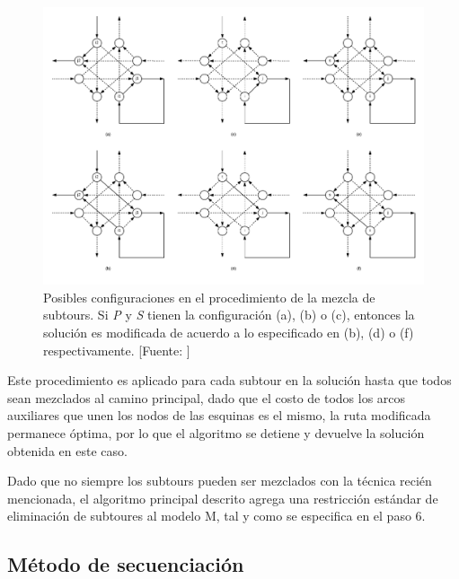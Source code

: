 \begin{figure}[tbp]
\centerline{\includegraphics[width=13cm]{mezcla_subtours.png}}
\caption{Posibles configuraciones en el procedimiento de la mezcla de subtours. Si \textit{P} y \textit{S} tienen la configuración (a), (b) o (c), entonces la solución es modificada de acuerdo a lo especificado en (b), (d) o (f) respectivamente. [Fuente: \citet{Braier2017AnArgentina}]}
\label{fig:procedimiento_mezcla_subtours}
\end{figure}

Este procedimiento es aplicado para cada subtour en la solución hasta que todos sean mezclados al camino principal, dado que el costo de todos los arcos auxiliares que unen los nodos de las esquinas es el mismo, la ruta modificada permanece óptima, por lo que el algoritmo se detiene y devuelve la solución obtenida en este caso.

Dado que no siempre los subtours pueden ser mezclados con la técnica recién mencionada, el algoritmo principal descrito agrega una restricción estándar de eliminación de subtoures al modelo M, tal y como se especifica en el paso 6.

\subsection{Método de secuenciación}


